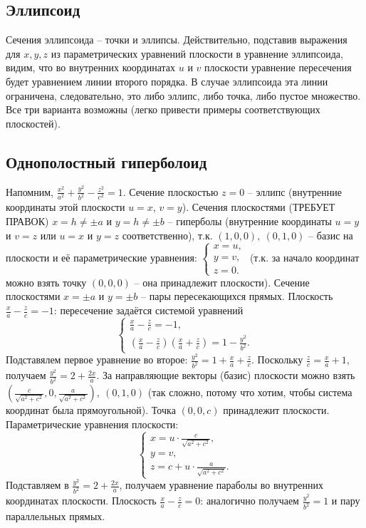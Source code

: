 \documentclass[a4paper, 12pt]{article}
\theoremstyle{definition}
\begin{document}
\subsection{Эллипсоид}
Сечения эллипсоида – точки и эллипсы.
Действительно, подставив выражения для $x, y, z$ из параметрических уравнений плоскости в уравнение эллипсоида, видим, что во внутренних координатах $u$ и $v$ плоскости уравнение пересечения будет уравнением линии второго порядка.
В случае эллипсоида эта линии ограничена, следовательно, это либо эллипс, либо точка, либо пустое множество. Все три варианта возможны (легко привести примеры соответствующих плоскостей).

\subsection{Однополостный гиперболоид}
Напомним, $\frac{x^2}{a^2} + \frac{y^2}{b^2} - \frac{z^2}{c^2} = 1$.
Сечение плоскостью $z = 0$ – эллипс (внутренние координаты этой плоскости $u = x$, $v = y$). Сечения плоскостями (ТРЕБУЕТ ПРАВОК) $x = h \neq \pm a$ и $y = h \neq \pm b$ – гиперболы (внутренние координаты $u = y$ и $v = z$ или $u = x$ и $y = z$ соответственно), т.к. $(1,0,0), \ (0,1,0)$ – базис на плоскости и её параметрические уравнения: 
$\begin{cases}
    x = u, \\
    y = v, \\
    z = 0.
\end{cases}$
(т.к. за начало координат можно взять точку $(0,0,0)$ – она принадлежит плоскости).
Сечение плоскостями $x = \pm a$ и $y = \pm b$ – пары пересекающихся прямых.
Плоскость $\frac{x}{a} - \frac{z}{c} = -1$: пересечение задаётся системой уравнений
\[\begin{cases}
    \frac{x}{a} - \frac{z}{c} = -1, \\
    \left(\frac{x}{a} - \frac{z}{c}\right) \left(\frac{x}{a} + \frac{z}{c}\right) = 1 - \frac{y^2}{b^2}.
\end{cases}\]
Подставялем первое уравнение во второе:
$\frac{y^2}{b^2} = 1 + \frac{x}{a} + \frac{z}{c}$.
Поскольку $\frac{z}{c} = \frac{x}{a} + 1$, получаем
$\frac{y^2}{b^2} = 2 + \frac{2x}{a}$.
За направляющие векторы (базис) плоскости можно взять
$\left(\frac{c}{\sqrt{a^2+c^2}}, 0, \frac{a}{\sqrt{a^2+c^2}}\right), \ (0,1,0)$ (так сложно, потому что хотим, чтобы система координат была прямоугольной).
Точка $(0,0,c)$ принадлежит плоскости.
Параметрические уравнения плоскости:
\[\begin{cases}
    x = u \cdot \frac{c}{\sqrt{a^2+c^2}}, \\
    y = v, \\
    z = c + u \cdot \frac{a}{\sqrt{a^2+c^2}}.
\end{cases}\]
Подставляем в $\frac{y^2}{b^2} = 2 + \frac{2x}{a}$, получаем уравнение параболы во внутренних координатах плоскости.
Плоскость $\frac{x}{a} - \frac{z}{c} = 0$:
аналогично получаем $\frac{y^2}{b^2} = 1$ и пару параллельных прямых.
\end{document}
